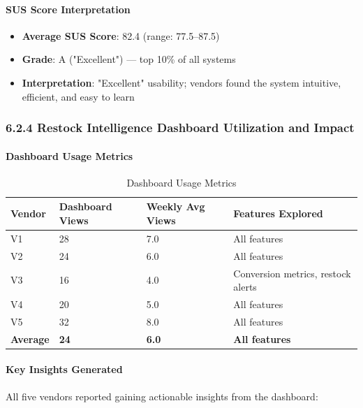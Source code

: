 \documentclass[12pt,a4paper]{article}
\begin{document}
\paragraph{SUS Score Interpretation}

\begin{itemize}
    \item \textbf{Average SUS Score}: 82.4 (range: 77.5--87.5)
    \item \textbf{Grade}: A ("Excellent") --- top 10\% of all systems
    \item \textbf{Interpretation}: "Excellent" usability; vendors found the system intuitive, efficient, and easy to learn
\end{itemize}

\subsubsection{6.2.4 Restock Intelligence Dashboard Utilization and Impact}

\paragraph{Dashboard Usage Metrics}

\begin{table}[h]
\centering
\caption{Dashboard Usage Metrics}
\label{tab:dashboard_usage}
\begin{tabular}{p{3cm}p{3cm}p{3cm}p{5cm}}
\toprule
\textbf{Vendor} & \textbf{Dashboard Views} & \textbf{Weekly Avg Views} & \textbf{Features Explored} \\
\midrule
V1 & 28 & 7.0 & All features \\
V2 & 24 & 6.0 & All features \\
V3 & 16 & 4.0 & Conversion metrics, restock alerts \\
V4 & 20 & 5.0 & All features \\
V5 & 32 & 8.0 & All features \\
\hline
\textbf{Average} & \textbf{24} & \textbf{6.0} & \textbf{All features} \\
\bottomrule
\end{tabular}
\end{table}

\paragraph{Key Insights Generated}

All five vendors reported gaining actionable insights from the dashboard:
\end{document}
